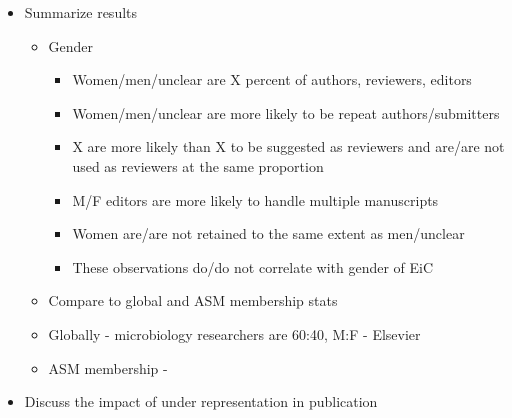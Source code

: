 \documentclass[11pt,]{article}
\providecommand{\tightlist}{%
  \setlength{\itemsep}{0pt}\setlength{\parskip}{0pt}}
\begin{document}
\begin{itemize}
\tightlist
\item
  Summarize results

  \begin{itemize}
  \tightlist
  \item
    Gender

    \begin{itemize}
    \tightlist
    \item
      Women/men/unclear are X percent of authors, reviewers, editors
    \item
      Women/men/unclear are more likely to be repeat authors/submitters
    \item
      X are more likely than X to be suggested as reviewers and are/are
      not used as reviewers at the same proportion
    \item
      M/F editors are more likely to handle multiple manuscripts
    \item
      Women are/are not retained to the same extent as men/unclear
    \item
      These observations do/do not correlate with gender of EiC
    \end{itemize}
  \item
    Compare to global and ASM membership stats
  \item
    Globally - microbiology researchers are 60:40, M:F - Elsevier
  \item
    ASM membership -
  \end{itemize}
\item
  Discuss the impact of under representation in publication


\end{itemize}
\end{document}
